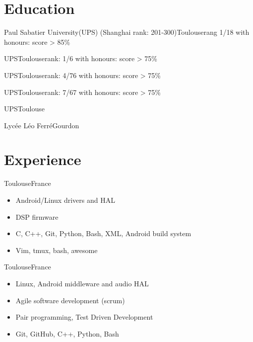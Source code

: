 \documentclass[a4paper,11pt]{moderncv}
\begin{document}
\maketitle

\section{Education}
{Paul Sabatier University(UPS) (Shanghai rank: 201-300)}{Toulouse}{rang 1/18}
{
    with honours: score > 85\%
}

{UPS}{Toulouse}{rank: 1/6}
{
    with honours: score > 75\%
}

{UPS}{Toulouse}{rank: 4/76}
{
    with honours: score > 75\%
}

{UPS}{Toulouse}{rank: 7/67}
{
    with honours: score > 75\%
}

{UPS}{Toulouse}{}
{
}

{Lycée Léo Ferré}{Gourdon}{}
{}


\section{Experience}
{Toulouse}{France}
{
    \begin{itemize}
        \item Android/Linux drivers and HAL
        \item DSP firmware
        \item C, C++, Git, Python, Bash, XML, Android build system
        \item Vim, tmux, bash, awesome
    \end{itemize}
}

{Toulouse}{France}
{
    \begin{itemize}
        \item Linux, Android middleware and audio HAL
        \item Agile software development (scrum)
        \item Pair programming, Test Driven Development
        \item Git, GitHub, C++, Python, Bash
    \end{itemize}
}
\end{document}
